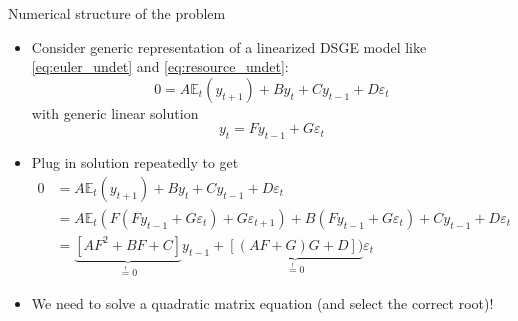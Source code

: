 \documentclass[handout,usepdftitle=false,xcolor=dvipsnames,aspectratio=169]{beamer}
\begin{document}
\begin{frame}[fragile]{Numerical structure of the problem}
\begin{itemize}
  \item Consider generic representation of a linearized DSGE model like \eqref{eq:euler_undet} and \eqref{eq:resource_undet}:
  \begin{equation}
    0=A\mathbb{E}_t(y_{t+1})+By_t+Cy_{t-1}+D\varepsilon_t
  \end{equation}
  with generic linear solution
  \begin{equation}
    y_t=Fy_{t-1}+G\varepsilon_t
  \end{equation}
  \item Plug in solution repeatedly to get
   \begin{align}
    0&=A\mathbb{E}_t(y_{t+1})+By_t+Cy_{t-1}+D\varepsilon_t\\
     &=A\mathbb{E}_t(F(Fy_{t-1}+G\varepsilon_t)+G\varepsilon_{t+1})+B(Fy_{t-1}+G\varepsilon_t)+Cy_{t-1}+D\varepsilon_t\\
    &=\underbrace{\left[AF^2+BF+C\right]}_{\overset{!}{=}0}y_{t-1}+\underbrace{\left[(AF+G)G+D\right])}_{\overset{!}{=}0}\varepsilon_t
  \end{align}
\item We need to solve a quadratic matrix equation (and select the correct root)!
\end{itemize}
\end{frame}
\end{document}
